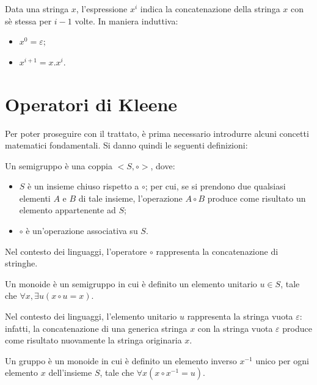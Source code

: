   Data una stringa \(x\), l'espressione \(x^i\) indica la concatenazione della stringa \(x\) con sè stessa per \(i-1\) volte. In maniera induttiva:
  \begin{itemize}
    \item \(x^0 = \varepsilon\);
    \item \(x^{i+1} = x.x^{i}\).
  \end{itemize}

  \section{Operatori di Kleene}
  Per poter proseguire con il trattato, è prima necessario introdurre alcuni concetti matematici fondamentali. Si danno quindi le seguenti definizioni:
  \begin{definition}[Semigruppo] \label{Semigruppo}
    Un semigruppo è una coppia \(<S, \circ >\), dove:
    \begin{itemize}
      \item \(S\) è un insieme chiuso rispetto a \(\circ\); per cui, se si prendono due qualsiasi elementi \(A\) e \(B\) di tale insieme, l'operazione \(A\circ B\) produce come risultato un elemento appartenente ad \(S\);
      \item \(\circ\) è un'operazione associativa su \(S\).
    \end{itemize}
  \end{definition}

  Nel contesto dei linguaggi, l'operatore \(\circ\) rappresenta la concatenazione di stringhe.
  
  \begin{definition}[Monoide] \label{Monoide}
    Un monoide è un semigruppo in cui è definito un elemento unitario \(u\in S\), tale che \(\forall x, \exists u(x\circ u = x)\).
  \end{definition}

  Nel contesto dei linguaggi, l'elemento unitario \(u\) rappresenta la stringa vuota \(\varepsilon\): infatti, la concatenazione di una generica stringa \(x\) con la stringa vuota \(\varepsilon\) produce come risultato nuovamente la stringa originaria \(x\). 

  \begin{definition}[Gruppo] \label{Gruppo}
    Un gruppo è un monoide in cui è definito un elemento inverso \(x^{-1}\) unico per ogni elemento \(x\) dell'insieme \(S\), tale che \(\forall x(x\circ x^{-1} = u)\).
  \end{definition}


